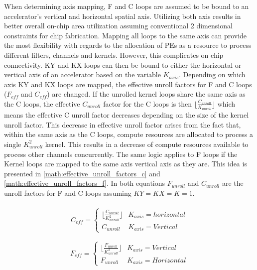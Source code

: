 When determining axis mapping, F and C loops are assumed to be bound to an
accelerator's vertical and horizontal spatial axis. Utilizing both axis results
in better overall on-chip area utilization assuming conventional 2 dimensional
constraints for chip fabrication. Mapping all loops to the same axis can provide
the most flexibility with regards to the allocation of PEs as a resource to
process different filters, channels and kernels. However, this complicates on
chip connectivity. KY and KX loops can then be
bound to either the horizontal or vertical axis of an accelerator based on the
variable $K_{axis}$.  Depending on which axis KY and KX loops are mapped, the
effective unroll factors for F and C loops ($F_{eff}$ and $C_{eff}$) are
changed. If the unrolled kernel loops share the same axis as the C loops, the
effective $C_{unroll}$ factor for the C loops is then $\lfloor
\frac{C_{unroll}}{K_{unroll}} \rfloor$ which means the effective C unroll factor
decreases depending on the size of the kernel unroll factor. This decrease in
effective unroll factor arises from the fact that, within the same axis as the C
loops, compute resources are allocated to process a single $K^2_{unroll}$ kernel. This
results in a decrease of compute resources available to process other channels
concurrently. The same logic applies to F loops if the Kernel loops are mapped
to the same axis vertical axis as they are. This idea is presented in
\autoref{math:effective_unroll_factors_c} and
\autoref{math:effective_unroll_factors_f}. In both equations $F_{unroll}$ and
$C_{unroll}$ are the unroll factors for F and C loops assuming $KY=KX=K=1$.


\begin{align}
    \begin{gathered}
        C_{eff} = \begin{cases} \lfloor \frac{C_{unroll}}{K^{2}_{unroll}} \rfloor & K_{axis} = horizontal\\ C_{unroll} & K_{axis} = Vertical\end{cases} \\
        \end{gathered}
    \label{math:effective_unroll_factors_c}
\end{align}
\begin{align}
    \begin{gathered}
        F_{eff} = \begin{cases} \lfloor \frac{F_{unroll}}{K^{2}_{unroll}} \rfloor & K_{axis} = Vertical\\ F_{unroll} & K_{axis} = Horizontal\end{cases} \\
        \end{gathered}
    \label{math:effective_unroll_factors_f}
\end{align}


